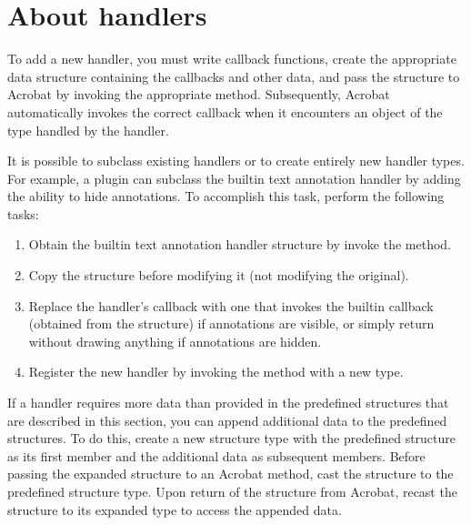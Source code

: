 \documentclass[letterpaper,12pt,english,openany,oneside]{sphinxmanual}
\begin{document}
\section{About handlers}
\label{\detokenize{Plugins_Handlers:about-handlers}}
To add a new handler, you must write callback functions, create the appropriate data structure containing the callbacks and other data, and pass the structure to Acrobat by invoking the appropriate method. Subsequently, Acrobat automatically invokes the correct callback when it encounters an object of the type handled by the handler.

It is possible to subclass existing handlers or to create entirely new handler types. For example, a plugin can subclass the built\sphinxhyphen{}in text annotation handler by adding the ability to hide annotations. To accomplish this task, perform the following tasks:
\begin{enumerate}
%
\item {} 
Obtain the built\sphinxhyphen{}in text annotation handler structure by invoke the  method.

\item {} 
Copy the structure before modifying it (not modifying the original).

\item {} 
Replace the handler’s  callback with one that invokes the built\sphinxhyphen{}in  callback (obtained from the structure) if annotations are visible, or simply return without drawing anything if annotations are hidden.

\item {} 
Register the new handler by invoking the  method with a new type.

\end{enumerate}

If a handler requires more data than provided in the predefined structures that are described in this section, you can append additional data to the predefined structures. To do this, create a new structure type with the predefined structure as its first member and the additional data as subsequent members. Before passing the expanded structure to an Acrobat method, cast the structure to the predefined structure type. Upon return of the structure from Acrobat, re\sphinxhyphen{}cast the structure to its expanded type to access the appended data.
\end{document}
